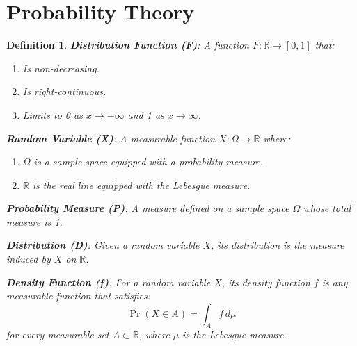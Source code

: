 \documentclass{article}
\newtheorem{definition}{Definition}
\theoremstyle{remark}
\begin{document}
\section{Probability Theory}
\begin{definition}
    \textbf{Distribution Function (F)}: A function \( F: \mathbb{R} \rightarrow [0,1] \) that:
    \begin{enumerate}
        \item Is non-decreasing.
        \item Is right-continuous.
        \item Limits to 0 as \( x \rightarrow -\infty \) and 1 as \( x \rightarrow \infty \).
    \end{enumerate}
    
    \textbf{Random Variable (X)}: A measurable function \( X: \Omega \rightarrow \mathbb{R} \) where:
    \begin{enumerate}
        \item \( \Omega \) is a sample space equipped with a probability measure.
        \item \( \mathbb{R} \) is the real line equipped with the Lebesgue measure.
    \end{enumerate}
    
    \textbf{Probability Measure (P)}: A measure defined on a sample space \( \Omega \) whose total measure is 1.
    
    \textbf{Distribution (D)}: Given a random variable \( X \), its distribution is the measure induced by \( X \) on \( \mathbb{R} \).
    
    \textbf{Density Function (f)}: For a random variable \( X \), its density function \( f \) is any measurable function that satisfies:
    \[ \Pr(X \in A) = \int_A f \, d\mu \]
    for every measurable set \( A \subset \mathbb{R} \), where \( \mu \) is the Lebesgue measure.
    \end{definition}
    
\end{document}

